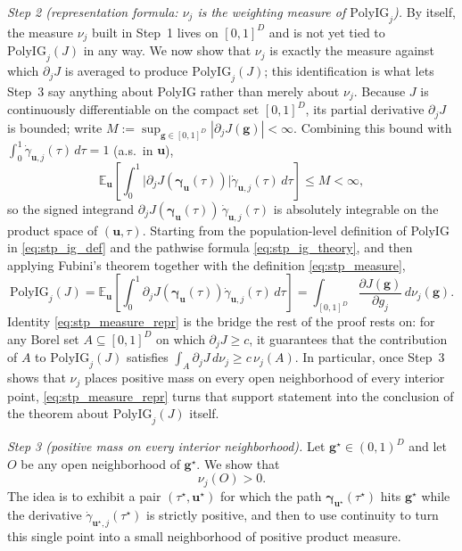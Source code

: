 \emph{Step 2 (representation formula: $\nu_j$ is the weighting measure of $\mathrm{PolyIG}_j$).}
By itself, the measure $\nu_j$ built in Step~1 lives on $[0,1]^D$ and is not yet tied to $\mathrm{PolyIG}_j(J)$ in any way. We now show that $\nu_j$ is exactly the measure against which $\partial_j J$ is averaged to produce $\mathrm{PolyIG}_j(J)$; this identification is what lets Step~3 say anything about PolyIG rather than merely about $\nu_j$.
Because $J$ is continuously differentiable on the compact set $[0,1]^D$, its partial derivative $\partial_j J$ is bounded; write $M:=\sup_{\mathbf{g}\in[0,1]^D}|\partial_j J(\mathbf{g})|<\infty$. Combining this bound with $\int_0^1\dot{\gamma}_{\mathbf{u},j}(\tau)\,d\tau=1$ (a.s.\ in $\mathbf{u}$),
\[
\mathbb{E}_{\mathbf{u}}\!\left[
\int_0^1
\bigl|\partial_j J(\boldsymbol{\gamma}_{\mathbf{u}}(\tau))\bigr|
\dot{\gamma}_{\mathbf{u},j}(\tau)\,d\tau
\right]
\le M<\infty,
\]
so the signed integrand $\partial_j J(\boldsymbol{\gamma}_{\mathbf{u}}(\tau))\,\dot{\gamma}_{\mathbf{u},j}(\tau)$ is absolutely integrable on the product space of $(\mathbf{u},\tau)$. Starting from the population-level definition of PolyIG in \eqref{eq:stp_ig_def} and the pathwise formula \eqref{eq:stp_ig_theory}, and then applying Fubini's theorem together with the definition \eqref{eq:stp_measure},
\begin{equation}
\mathrm{PolyIG}_j(J)
=
\mathbb{E}_{\mathbf{u}}\!\left[
\int_0^1
\partial_j J(\boldsymbol{\gamma}_{\mathbf{u}}(\tau))
\dot{\gamma}_{\mathbf{u},j}(\tau)\,d\tau
\right]
=
\int_{[0,1]^D}
\frac{\partial J(\mathbf{g})}{\partial g_j}\,
d\nu_j(\mathbf{g}).
\label{eq:stp_measure_repr}
\end{equation}
Identity \eqref{eq:stp_measure_repr} is the bridge the rest of the proof rests on: for any Borel set $A\subseteq[0,1]^D$ on which $\partial_j J\ge c$, it guarantees that the contribution of $A$ to $\mathrm{PolyIG}_j(J)$ satisfies $\int_A\partial_j J\,d\nu_j\ge c\,\nu_j(A)$. In particular, once Step~3 shows that $\nu_j$ places positive mass on every open neighborhood of every interior point, \eqref{eq:stp_measure_repr} turns that support statement into the conclusion of the theorem about $\mathrm{PolyIG}_j(J)$ itself.

\emph{Step 3 (positive mass on every interior neighborhood).}
Let $\mathbf{g}^{\star}\in(0,1)^D$ and let $O$ be any open neighborhood of $\mathbf{g}^{\star}$. We show that
\begin{equation}
\nu_j(O)>0.
\label{eq:positive_mass}
\end{equation}
The idea is to exhibit a pair $(\tau^{\star},\mathbf{u}^{\star})$ for which the path $\boldsymbol{\gamma}_{\mathbf{u}^{\star}}(\tau^{\star})$ hits $\mathbf{g}^{\star}$ while the derivative $\dot{\gamma}_{\mathbf{u}^{\star},j}(\tau^{\star})$ is strictly positive, and then to use continuity to turn this single point into a small neighborhood of positive product measure.

